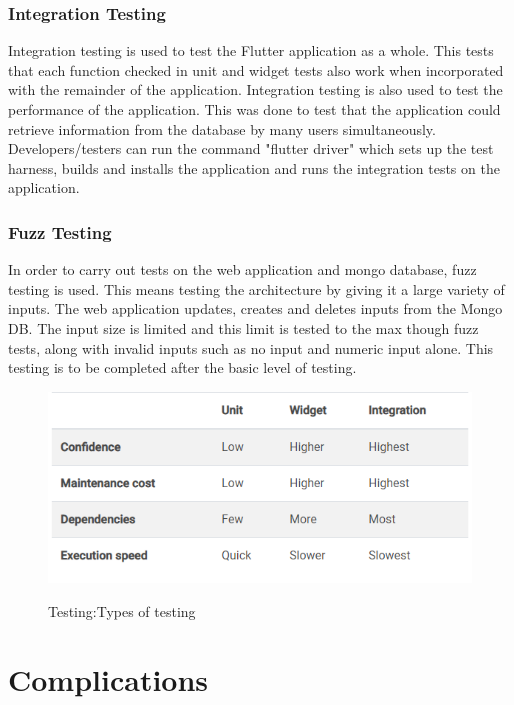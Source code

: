 \subsubsection{Integration Testing}

Integration testing is used to test the Flutter application as a whole. This tests that each function checked in unit and widget tests also work when incorporated with the remainder of the application. Integration testing is also used to test the performance of the application. This was done to test that the application could retrieve information from the database by many users simultaneously. Developers/testers can run the command "flutter driver" which sets up the test harness, builds and installs the application and runs the integration tests on the application. \cite{IntegrationTest}

\subsubsection{Fuzz Testing}
In order to carry out tests on the web application and mongo database, fuzz testing is used. This means testing the architecture by giving it a large variety of inputs. The web application updates, creates and deletes inputs from the Mongo DB. The input size is limited and this limit is tested to the max though fuzz tests, along with invalid inputs such as no input and numeric input alone. This testing is to be completed after the basic level of testing.

\begin{figure}[ht!]
    \centering
 \includegraphics[width=125mm,scale=0.5]{img/Capture.PNG}
\caption{Testing:Types of testing}
\cite{testing}
\label{fig:method}
\end{figure}

\section{Complications}
